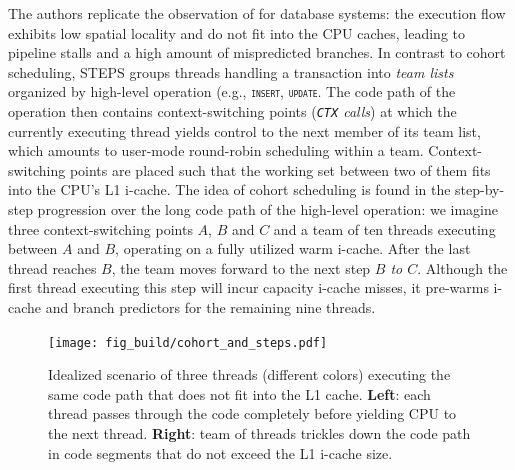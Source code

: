 \documentclass[12pt,a4paper]{book}
\begin{document}
The authors replicate the observation of \cite{cohort} for database systems: the execution flow exhibits low spatial locality and do not fit into the CPU caches, leading to pipeline stalls and a high amount of mispredicted branches.
In contrast to cohort scheduling, STEPS groups threads handling a transaction into \emph{team lists} organized by high-level operation (e.g., \texttt{\textsc{insert}}, \texttt{\textsc{update}}.
The code path of the operation then contains context-switching points (\textit{\texttt{CTX} calls}) at which the currently executing thread yields control to the next member of its team list, which amounts to user-mode round-robin scheduling within a team.
Context-switching points are placed such that the working set between two of them fits into the CPU's L1 i-cache.
The idea of cohort scheduling is found in the step-by-step progression over the long code path of the high-level operation:
we imagine three context-switching points $A$, $B$ and $C$ and a team of ten threads executing between $A$ and $B$, operating on a fully utilized warm i-cache.
After the last thread reaches $B$, the team moves forward to the next step  \textit{$B$ to $C$}.
Although the first thread executing this step will incur capacity i-cache misses, it pre-warms i-cache and branch predictors for the remaining nine threads.~\cite{steps}

\begin{figure}[h]
    \centering
    \texttt{[image: fig\_build/cohort\_and\_steps.pdf]}
    \caption{
        Idealized scenario of three threads (different colors) executing the same code path that does not fit into the L1 cache.
        \textbf{Left}: each thread passes through the code completely before yielding CPU to the next thread.
        \textbf{Right}: team of threads trickles down the code path in code segments that do not exceed the L1 i-cache size.
    }
    \label{fig:cohort_and_steps}
\end{figure}
\end{document}
